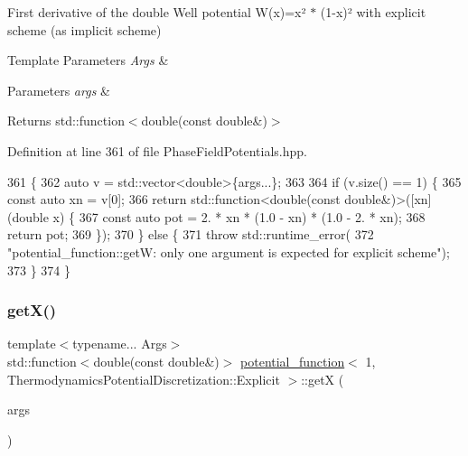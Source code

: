 First derivative of the double Well potential W(x)=x² $\ast$ (1-\/x)² with explicit scheme (as implicit scheme) 


\begin{DoxyTemplParams}{Template Parameters}
{\em Args} & \\
\hline
\end{DoxyTemplParams}

\begin{DoxyParams}{Parameters}
{\em args} & \\
\hline
\end{DoxyParams}
\begin{DoxyReturn}{Returns}
std\+::function$<$double(const double\&)$>$ 
\end{DoxyReturn}


Definition at line 361 of file Phase\+Field\+Potentials.\+hpp.


\begin{DoxyCode}
361                                                         \{
362     \textcolor{keyword}{auto} v = std::vector<double>\{args...\};
363 
364     \textcolor{keywordflow}{if} (v.size() == 1) \{
365       \textcolor{keyword}{const} \textcolor{keyword}{auto} xn = v[0];
366       \textcolor{keywordflow}{return} std::function<double(const double&)>([xn](\textcolor{keywordtype}{double} x) \{
367         \textcolor{keyword}{const} \textcolor{keyword}{auto} pot = 2. * xn * (1.0 - xn) * (1.0 - 2. * xn);
368         \textcolor{keywordflow}{return} pot;
369       \});
370     \} \textcolor{keywordflow}{else} \{
371       \textcolor{keywordflow}{throw} std::runtime\_error(
372           \textcolor{stringliteral}{"potential\_function::getW: only one argument is expected for explicit scheme"});
373     \}
374   \}
\end{DoxyCode}
\mbox{\label{structpotential__function_3_011_00_01ThermodynamicsPotentialDiscretization_1_1Explicit_01_4_aaf5a701d015b3c450af251a86a2e66c2}} 
\subsubsection{\texorpdfstring{get\+X()}{getX()}}
{\footnotesize\ttfamily template$<$typename... Args$>$ \\
std\+::function$<$double(const double\&)$>$ \hyperlink{structpotential__function}{potential\+\_\+function}$<$ 1, Thermodynamics\+Potential\+Discretization\+::\+Explicit $>$\+::getX (\begin{DoxyParamCaption}\item[{Args...}]{args }\end{DoxyParamCaption})\hspace{0.3cm}{\ttfamily [inline]}}




